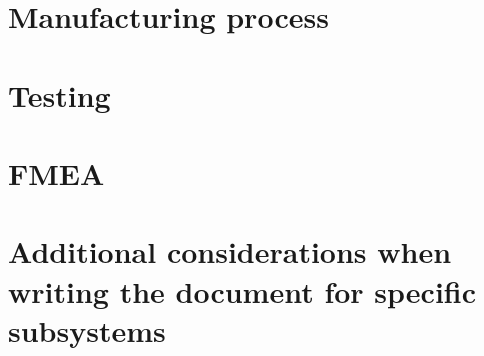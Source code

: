 \section{Manufacturing process}

\section{Testing}

\section{FMEA}

\section{Additional considerations when writing the document for specific subsystems}


\begin{comment}





\end{comment}

\newpage